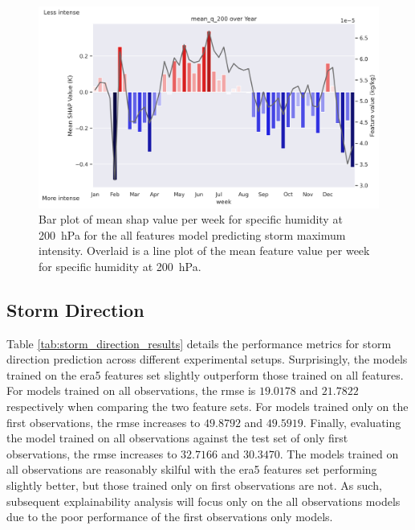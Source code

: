 \begin{figure}[ht]
    \centering
    \includegraphics[width=\textwidth]{../figures/generated/experiments/storm_max_intensity/temporal_corr/storm_max_intensity_all_shap_mean_q_200_by_week_over_year.png}
    \caption{Bar plot of mean \acrshort{shap} value per week for specific humidity at \SI{200}{\hecto\pascal} for the all features model predicting storm maximum intensity. Overlaid is a line plot of the mean feature value per week for specific humidity at \SI{200}{\hecto\pascal}.}
    \label{fig:storm_max_intensity_all_shap_mean_q_200_by_week_over_year}
\end{figure}

\clearpage
\subsection{Storm Direction}

Table \ref{tab:storm_direction_results} details the performance metrics for storm direction prediction across different experimental setups. Surprisingly, the models trained on the \acrshort{era5} features set slightly outperform those trained on all features. For models trained on all observations, the \acrshort{rmse} is $19.0178$ and $21.7822$ respectively when comparing the two feature sets. For models trained only on the first observations, the \acrshort{rmse} increases to $49.8792$ and $49.5919$. Finally, evaluating the model trained on all observations against the test set of only first observations, the \acrshort{rmse} increases to $32.7166$ and $30.3470$. The models trained on all observations are reasonably skilful with the \acrshort{era5} features set performing slightly better, but those trained only on first observations are not. As such, subsequent explainability analysis will focus only on the all observations models due to the poor performance of the first observations only models.

